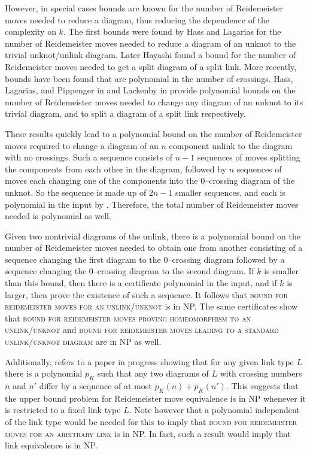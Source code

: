 \documentclass[12pt]{amsart}
\theoremstyle{definition}
\theoremstyle{remark}
\begin{document}
However, in special cases bounds are known for the number of Reidemeister moves needed to reduce a diagram, thus reducing the dependence of the complexity on $k$.  The first bounds were found by Hass and Lagarias \cite{HassLagarias1} for the number of Reidemeister moves needed to reduce a diagram of an unknot to the trivial unknot/unlink diagram.  Later Hayashi \cite{Hayashi1} found a bound for the number of Reidemeister moves needed to get a split diagram of a split link.  More recently, bounds have been found that are polynomial in the number of crossings. Hass, Lagarias, and Pippenger in \cite{HassLagariasPippenger1} and Lackenby in \cite{Lackenby2} provide polynomial bounds on the number of Reidemeister moves needed to change any diagram of an unknot to its trivial diagram, and to split a diagram of a split link respectively.

These results quickly lead to a polynomial bound on the number of Reidemeister moves required to change a diagram of an $n$ component unlink to the diagram with no crossings.  Such a sequence consists of $n-1$ sequences of moves splitting the components from each other in the diagram, followed by $n$ sequences of moves each changing one of the components into the 0--crossing diagram of the unknot.  So the sequence is made up of $2n-1$ smaller sequences, and each is polynomial in the input by \cite{HassLagariasPippenger1,Lackenby2}. Therefore, the total number of Reidemeister moves needed is polynomial as well.

Given two nontrivial diagrams of the unlink, there is a polynomial bound on the number of Reidemeister moves needed to obtain one from another consisting of a sequence changing the first diagram to the 0--crossing diagram followed by a sequence changing the 0--crossing diagram to the second diagram.  If $k$ is smaller than this bound, then there is a certificate polynomial in the input, and if $k$ is larger, then \cite{HassLagariasPippenger1,Lackenby2} prove the existence of such a sequence.  It follows that \textsc{bound for reidemeister moves for an unlink/unknot} is in NP.  The same certificates show that \textsc{bound for reidemeister moves proving homeomorphism to an unlink/unknot} and \textsc{bound for reidemeister moves leading to a standard unlink/unknot diagram} are in NP as well.

Additionally, \cite{Lackenby3} refers to a paper in progress \cite{Lackenby4} showing that for any given link type $L$ there is a polynomial $p_K$ such that any
two diagrams of $L$ with crossing numbers $n$ and $n'$ differ by a sequence of at most $p_K(n) + p_K(n')$.  This suggests that the upper bound problem for Reidemeister move equivalence is in NP whenever it is restricted to a fixed link type $L$.  Note however that a polynomial independent of the link type would be needed for this to imply that \textsc{bound for reidemeister moves for an arbitrary link} is in NP.  In fact, such a result would imply that link equivalence is in NP.
\end{document}
